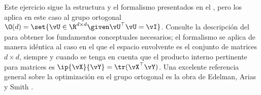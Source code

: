 \documentclass[../../book-main.tex]{subfiles}
\begin{document}
\begin{exercise}\label{exercise:orthogonal-group-calculus}
    Este ejercicio sigue la estructura y el formalismo presentados en el
    , pero los aplica en este caso al
    grupo ortogonal $\O(d) = \set{\vU \in \R^{d \times d} \given 
    \vU^\top \vU = \vI}$.
    Consulte la descripción del  para
    obtener los fundamentos conceptuales necesarios; el formalismo se aplica
    de manera idéntica al caso en el que el espacio envolvente es el conjunto de matrices $d
    \times d$, siempre y cuando se tenga en cuenta que el producto interno
    pertinente para matrices es $\ip{\vX}{\vY} = \tr(\vX^\top \vY)$.
    Una excelente referencia general sobre la optimización en
    el grupo ortogonal es la obra de Edelman, Arias y Smith \cite{Edelman1998-lg}.


\end{exercise}
\end{document}
